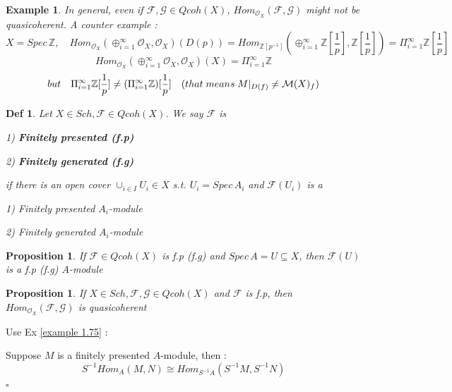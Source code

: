 \documentclass{article}
\newtheorem{definition}[theorem]{Def}
\newtheorem{example}[theorem]{Example}
\newtheorem{proposition}[theorem]{Proposition}
\newenvironment{Proof}{{\noindent \indent \it Proof:\quad}}{\hfill $\square$\par}
\begin{document}
\begin{example}
    In general, even if $\mathcal F,\mathcal G\in Qcoh(X)$, ${Hom}_{\mathcal O_X}(\mathcal F,\mathcal G)$ might not be quasicoherent. A counter example :
    $$
    X=Spec\,\mathbb Z,\quad {Hom}_{\mathcal O_X}(\oplus_{i=1}^{\infty}\mathcal O_X,\mathcal O_X)(D(p))
    =Hom_{\mathbb Z[p^{-1}]}(\oplus_{i=1}^{\infty}\mathbb Z[\frac{1}{p}],\mathbb Z[\frac{1}{p}])
    =\Pi_{i=1}^{\infty}
    \mathbb Z[\frac{1}{p}]
    $$
    $$
    Hom_{\mathcal O_X}(\oplus_{i=1}^{\infty}\mathcal O_X,\mathcal O_X)(X)=\Pi_{i=1}^{\infty} \mathbb Z
    $$
    $$
    but \quad \Pi_{i=1}^{\infty}
    \mathbb Z[\frac{1}{p}]
    \ne
    (\Pi_{i=1} ^{\infty}  
    \mathbb Z) [\frac{1}{p}]\quad (that\;means\;\mathcal \mathcal M|_{D(f)}\ne \mathcal M(X)_f) 
    $$
\end{example}

\begin{definition}
    Let $X\in Sch,\mathcal F\in Qcoh(X)$. We say $\mathcal F$ is 

    1) \textbf{Finitely presented (f.p)}

    2) \textbf{Finitely generated (f.g)}

    if there is an open cover $\cup_{i\in I}U_i\in X$ s.t. $U_i=Spec\,A_i$ and $\mathcal F(U_i)$ is a

    1) Finitely presented $A_i$-module

    2) Finitely generated $A_i$-module
\end{definition}

\begin{proposition}
    If $\mathcal F\in Qcoh(X)$ is f.p (f.g) and $Spec\,A=U\subseteq X$, then $\mathcal F(U)$ is a f.p (f.g) $A$-module
\end{proposition}

\begin{proposition}
    If $X\in Sch,\mathcal F,\mathcal G\in Qcoh(X)$ and $\mathcal F$ is f.p, then $Hom_{\mathcal O_X}(\mathcal F,\mathcal G)$ is quasicoherent
\end{proposition}
\begin{Proof}
Use Ex \ref{example 1.75} :

Suppose $M$ is a finitely presented $A$-module, then :
\begin{equation*}
S^{-1} Hom_A(M, N) \cong Hom_{S^{-1}A}(S^{-1}M, S^{-1}N)
\end{equation*}
\end{Proof}
\end{document}
